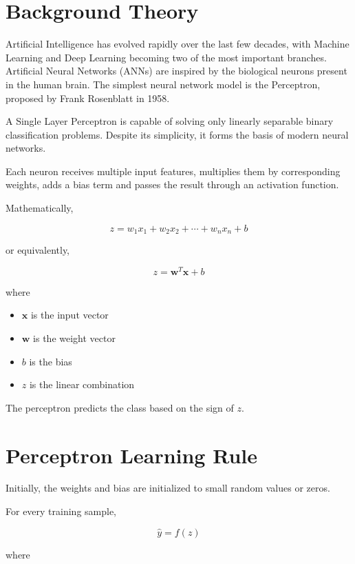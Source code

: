 \documentclass[12pt,a4paper]{article}
\begin{document}

\section{Background Theory}

Artificial Intelligence has evolved rapidly over the last few decades, with Machine Learning and Deep Learning becoming two of the most important branches. Artificial Neural Networks (ANNs) are inspired by the biological neurons present in the human brain. The simplest neural network model is the Perceptron, proposed by Frank Rosenblatt in 1958.

A Single Layer Perceptron is capable of solving only linearly separable binary classification problems. Despite its simplicity, it forms the basis of modern neural networks.

Each neuron receives multiple input features, multiplies them by corresponding weights, adds a bias term and passes the result through an activation function.

Mathematically,

\[
z=w_1x_1+w_2x_2+\cdots+w_nx_n+b
\]

or equivalently,

\[
z=\mathbf{w}^{T}\mathbf{x}+b
\]

where

\begin{itemize}
\item $\mathbf{x}$ is the input vector
\item $\mathbf{w}$ is the weight vector
\item $b$ is the bias
\item $z$ is the linear combination
\end{itemize}

The perceptron predicts the class based on the sign of $z$.


\section{Perceptron Learning Rule}

Initially, the weights and bias are initialized to small random values or zeros.

For every training sample,

\[
\hat y=f(z)
\]

where
\end{document}
